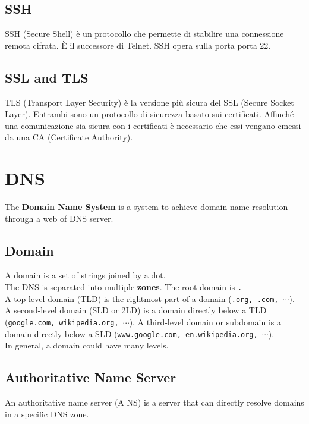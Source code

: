 \documentclass[a4paper]{article}
\begin{document}
\subsection{SSH}

SSH (Secure Shell) è un protocollo che permette di stabilire una connessione remota cifrata. È il successore di Telnet. SSH opera sulla porta porta 22.

\subsection{SSL and TLS}

TLS (Transport Layer Security) è la versione più sicura del SSL (Secure Socket Layer). 
Entrambi sono un protocollo di sicurezza basato sui certificati. Affinché una comunicazione sia sicura con i certificati è necessario che essi vengano emessi da una CA (Certificate Authority).

\pagebreak

\section{DNS}

The \textbf{Domain Name System} is a system to achieve
domain name resolution through a web of DNS server.

\subsection{Domain}

A domain is a set of strings joined by a dot. \\
The DNS is separated into multiple \textbf{zones}. The root domain is \texttt{.}\\
A top-level domain (TLD) is the rightmost part of a domain (\texttt{.org, .com, \(\cdots\)}). \\
A second-level domain (SLD or 2LD) is a domain directly below a TLD (\texttt{google.com, wikipedia.org, \(\cdots\)}).
A third-level domain or subdomain is a domain directly below a SLD (\texttt{www.google.com, en.wikipedia.org, \(\cdots\)}). \\
In general, a domain could have many levels.

\subsection{Authoritative Name Server}

An authoritative name server (A NS) is a server that can directly resolve domains in a specific DNS zone.
\end{document}

